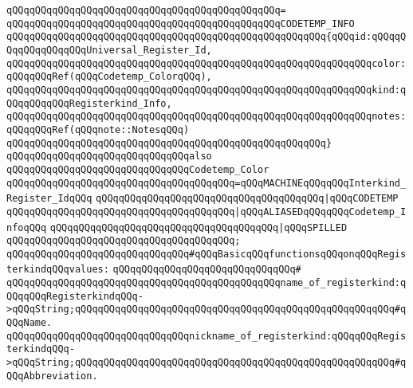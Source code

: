 \verb|qQQqqQQqqQQqqQQqqQQqqQQqqQQqqQQqqQQqqQQqqQQqqQQq=|\newline
\verb|qQQqqQQqqQQqqQQqqQQqqQQqqQQqqQQqqQQqqQQqqQQqqQQqCODETEMP_INFO|\newline
\verb|qQQqqQQqqQQqqQQqqQQqqQQqqQQqqQQqqQQqqQQqqQQqqQQqqQQqqQQq{qQQqid:qQQqqQQqqQQqqQQqqQQqUniversal_Register_Id,|\newline
\verb|qQQqqQQqqQQqqQQqqQQqqQQqqQQqqQQqqQQqqQQqqQQqqQQqqQQqqQQqqQQqqQQqcolor:qQQqqQQqRef(qQQqCodetemp_ColorqQQq),|\newline
\verb|qQQqqQQqqQQqqQQqqQQqqQQqqQQqqQQqqQQqqQQqqQQqqQQqqQQqqQQqqQQqqQQqkind:qQQqqQQqqQQqRegisterkind_Info,|\newline
\verb|qQQqqQQqqQQqqQQqqQQqqQQqqQQqqQQqqQQqqQQqqQQqqQQqqQQqqQQqqQQqqQQqnotes:qQQqqQQqRef(qQQqnote::NotesqQQq)|\newline
\verb|qQQqqQQqqQQqqQQqqQQqqQQqqQQqqQQqqQQqqQQqqQQqqQQqqQQqqQQq}|\newline
\verb|qQQqqQQqqQQqqQQqqQQqqQQqqQQqqQQqalso|\newline
\verb|qQQqqQQqqQQqqQQqqQQqqQQqqQQqqQQqCodetemp_Color|\newline
\verb|qQQqqQQqqQQqqQQqqQQqqQQqqQQqqQQqqQQqqQQq=qQQqMACHINEqQQqqQQqInterkind_Register_IdqQQq|\newline
\verb|qQQqqQQqqQQqqQQqqQQqqQQqqQQqqQQqqQQqqQQq|\verb#|qQQqCODETEMP#\newline
\verb|qQQqqQQqqQQqqQQqqQQqqQQqqQQqqQQqqQQqqQQq|\verb#|qQQqALIASEDqQQqqQQqCodetemp_InfoqQQq#\newline
\verb|qQQqqQQqqQQqqQQqqQQqqQQqqQQqqQQqqQQqqQQq|\verb#|qQQqSPILLED#\newline
\verb|qQQqqQQqqQQqqQQqqQQqqQQqqQQqqQQqqQQqqQQq;|\newline
\newline
\newline
\verb|qQQqqQQqqQQqqQQqqQQqqQQqqQQqqQQq#qQQqBasicqQQqfunctionsqQQqonqQQqRegisterkindqQQqvalues:|\newline
\verb|qQQqqQQqqQQqqQQqqQQqqQQqqQQqqQQq#|\newline
\verb|qQQqqQQqqQQqqQQqqQQqqQQqqQQqqQQqqQQqqQQqqQQqqQQqname_of_registerkind:qQQqqQQqRegisterkindqQQq->qQQqString;qQQqqQQqqQQqqQQqqQQqqQQqqQQqqQQqqQQqqQQqqQQqqQQqqQQqqQQq#qQQqName.|\newline
\verb|qQQqqQQqqQQqqQQqqQQqqQQqqQQqqQQqnickname_of_registerkind:qQQqqQQqRegisterkindqQQq->qQQqString;qQQqqQQqqQQqqQQqqQQqqQQqqQQqqQQqqQQqqQQqqQQqqQQqqQQqqQQq#qQQqAbbreviation.|\newline
\newline
